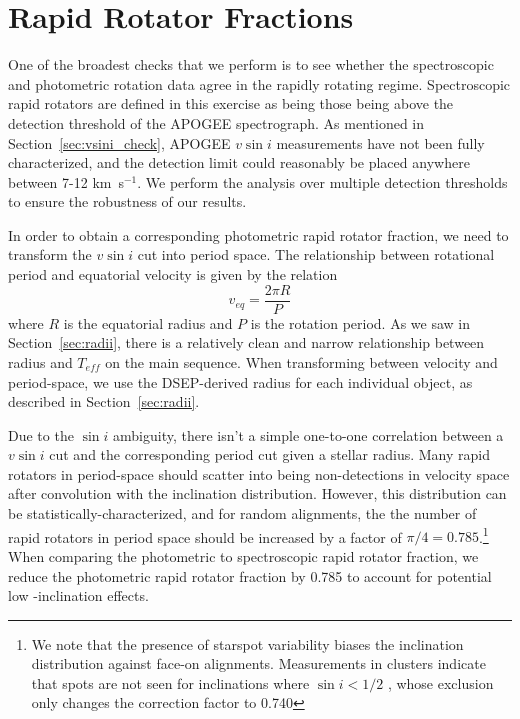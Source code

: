 \documentclass[manuscript]{aastex6}
\newcommand{\vsini}{\ensuremath{v \sin i}}
\newcommand{\Teff}{\ensuremath{T_{eff}}}
\newcommand{\kms}{\textrm{ km~s}\ensuremath{^{-1}}}
\begin{document}
\section{Rapid Rotator Fractions}
\label{sec:fraction}

One of the broadest checks that we perform is to see whether the spectroscopic
and photometric rotation data agree in the rapidly rotating regime.
Spectroscopic rapid rotators are defined in this exercise as being those being
above the detection threshold of the APOGEE spectrograph. As mentioned in 
Section~\ref{sec:vsini_check}, APOGEE \vsini{} measurements have not been fully
characterized, and the detection limit could reasonably be placed anywhere 
between 7-12 \kms{}. We perform the analysis over multiple detection thresholds
to ensure the robustness of our results.

In order to obtain a corresponding photometric rapid rotator fraction, we need to 
transform the \vsini{} cut into period space. The relationship between rotational 
period and equatorial velocity is given by the relation
\begin{displaymath}
    v_{eq} = \frac{2 \pi R}{P} 
\end{displaymath}
where \(R\) is the equatorial radius and \(P\) is the rotation period. As we
saw in Section~\ref{sec:radii}, there is a relatively clean and narrow
relationship between radius and \Teff{} on the main sequence. When transforming
between velocity and period-space, we use the DSEP-derived radius for each
individual object, as described in Section~\ref{sec:radii}.

Due to the \(\sin i\) ambiguity, there isn't a simple one-to-one correlation
between a \vsini{} cut and the corresponding period cut given a stellar radius.
Many rapid rotators in period-space should scatter into being non-detections in
velocity space after convolution with the inclination distribution. However,
this distribution can be statistically-characterized, and for random
alignments, the the number of rapid rotators in period space should be increased 
by a factor of \(\pi/4=0.785\).\footnote{We note that the presence of starspot 
    variability biases the
    inclination distribution against face-on alignments. Measurements
    in clusters indicate that spots are not seen for inclinations where 
    \(\sin i < 1/2\) \citep{Jackson10}, whose exclusion only changes the 
correction factor to 0.740} When
comparing the photometric to spectroscopic rapid rotator fraction, we reduce
the photometric rapid rotator fraction by 0.785 to account for potential low
-inclination effects.
\end{document}
